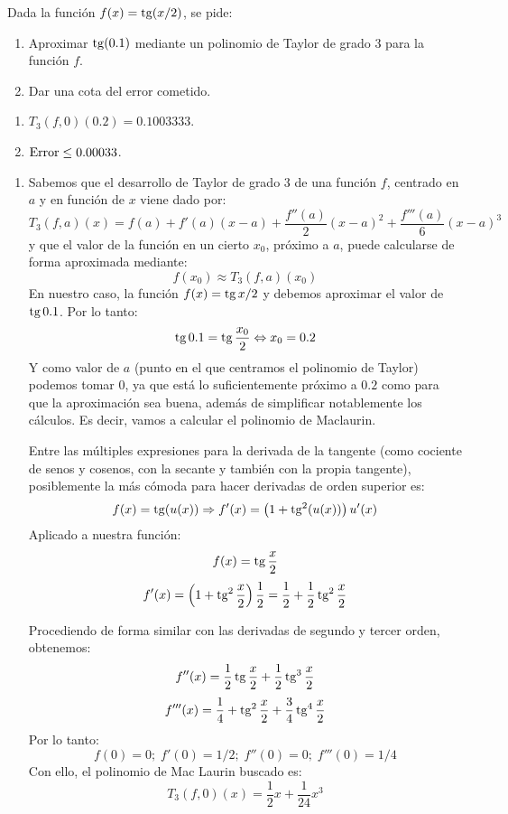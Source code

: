 {Dada la función $f(x)=\operatorname{tg}(x/2)$, se pide:
\begin{enumerate}
\item Aproximar $\operatorname{tg}(0.1)$ mediante un polinomio de Taylor de grado 3 para la función $f$.
\item Dar una cota del error cometido.
\end{enumerate}
}
{
\begin{enumerate}
\item $T_3 (f,0)(0.2) = 0.1003333$.
\item ${\rm Error} \le 0.00033$.
\end{enumerate}
}
{\begin{enumerate}
\item Sabemos que el desarrollo de Taylor de grado 3 de una función
$f$,  centrado en $a$ y en función de $x$ viene dado por:
\[
T_3 (f,a)(x) = f(a) + f'(a)(x - a) + \frac{{f''(a)}}{2}(x - a)^2  +
\frac{{f'''(a)}}{6}(x - a)^3
\]
y que el valor de la función en un cierto $x_0$, próximo a $a$,
puede calcularse de forma aproximada mediante:
\[
f(x_0 ) \approx T_3 (f,a)(x_0 )
\]
En nuestro caso, la función $f(x)= \operatorname{tg} x/2$ y debemos aproximar el
valor de $\operatorname{tg} 0.1$. Por lo tanto:
\[
\operatorname{tg} 0.1 = \operatorname{tg} \frac{{x_0 }}{2} \Leftrightarrow x_0  = 0.2
\]
Y como valor de $a$ (punto en el que centramos el polinomio de
Taylor) podemos tomar 0, ya que está lo suficientemente próximo a
$0.2$ como para que la aproximación sea buena, además de simplificar
notablemente los cálculos. Es decir, vamos a calcular el polinomio
de Maclaurin.

Entre las múltiples expresiones para la derivada de la tangente
(como cociente de senos y cosenos, con la secante y también con la
propia tangente), posiblemente la más cómoda para hacer derivadas de
orden superior es:
\[
f(x) = \operatorname{tg} (u(x)) \Rightarrow f'(x) = \left( {1 + \operatorname{tg} ^2 (u(x))}
\right)u'(x)
\]
Aplicado a nuestra función:
\[
f(x) = \operatorname{tg} \frac{x}{2}
\]
\[
f'(x) = \left( {1 + \operatorname{tg} ^2 \frac{x}{2}} \right)\frac{1}{2} =
\frac{1}{2} + \frac{1}{2}\operatorname{tg} ^2 \frac{x}{2}
\]

Procediendo de forma similar con las derivadas de segundo y tercer
orden, obtenemos:
\[
f''(x) = \frac{1}{2}\operatorname{tg} \frac{x}{2} + \frac{1}{2}\operatorname{tg} ^3
\frac{x}{2}
\]
\[
f'''(x) = \frac{1}{4} + \operatorname{tg} ^2 \frac{x}{2} + \frac{3}{4}\operatorname{tg} ^4
\frac{x}{2}
\]
Por lo tanto:
\[
f(0) = 0;\;f'(0) = 1/2;\;f''(0) = 0;\;f'''(0) = 1/4
\]
Con ello, el polinomio de Mac Laurin buscado es:
\[
T_3 (f,0)(x) = \frac{1}{2}x + \frac{1}{{24}}x^3
\]


\end{enumerate}}
